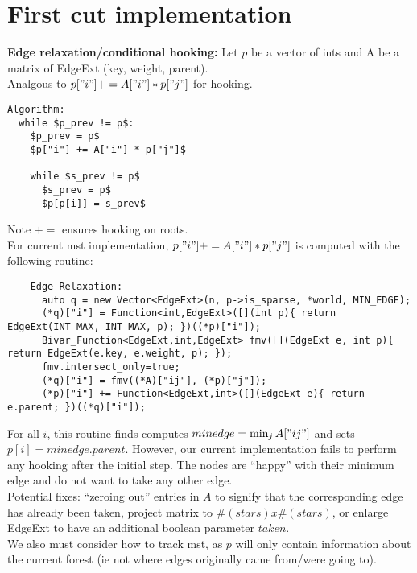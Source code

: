 \documentclass[11pt]{article}
\title{}
\author{}
\begin{document}
\maketitle

\section{First cut implementation}
\textbf{Edge relaxation/conditional hooking:} Let $p$ be a vector of ints and A be a matrix of EdgeExt (key, weight, parent).\\
Analgous to $p["i"] += A["i"] * p["j"]$ for hooking.

\begin{lstlisting}
Algorithm:
  while $p_prev != p$:
    $p_prev = p$
    $p["i"] += A["i"] * p["j"]$

    while $s_prev != p$
      $s_prev = p$
      $p[p[i]] = s_prev$
\end{lstlisting}

Note $+=$ ensures hooking on roots.\\

For current mst implementation, $p["i"] += A["i"] * p["j"]$ is computed with the following routine:
\begin{lstlisting}
    Edge Relaxation:
      auto q = new Vector<EdgeExt>(n, p->is_sparse, *world, MIN_EDGE);
      (*q)["i"] = Function<int,EdgeExt>([](int p){ return EdgeExt(INT_MAX, INT_MAX, p); })((*p)["i"]);
      Bivar_Function<EdgeExt,int,EdgeExt> fmv([](EdgeExt e, int p){ return EdgeExt(e.key, e.weight, p); });
      fmv.intersect_only=true;
      (*q)["i"] = fmv((*A)["ij"], (*p)["j"]);
      (*p)["i"] += Function<EdgeExt,int>([](EdgeExt e){ return e.parent; })((*q)["i"]);
\end{lstlisting}

For all $i$, this routine finds computes $minedge = \min_{j} A["ij"]$ and sets $p[i] = minedge.parent$. However, our current implementation fails to perform any hooking after the initial step. The nodes are ``happy'' with their minimum edge and do not want to take any other edge.\\

Potential fixes: ``zeroing out'' entries in $A$ to signify that the corresponding edge has already been taken, project matrix to $\#(stars) x \#(stars)$, or enlarge EdgeExt to have an additional boolean parameter $taken$.\\

We also must consider how to track mst, as $p$ will only contain information about the current forest (ie not where edges originally came from/were going to).
\end{document}
